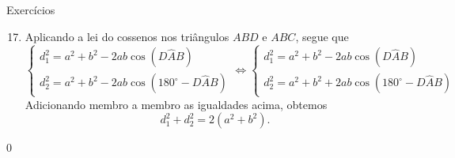 \begin{answer}{Exercícios}
{\exerciselist
\begin{enumerate}\setcounter{enumi}{16}
\item Aplicando a lei do cossenos nos triângulos $ABD$ e $ABC$, segue que
    $$\begin{cases}
    d_1^2=a^2+b^2-2ab\cos(D\hat{A}B)\\
    d_2^2=a^2+b^2-2ab\cos(180^\circ-D\hat{A}B)
    \end{cases} \iff
    \begin{cases}
    d_1^2=a^2+b^2-2ab\cos(D\hat{A}B)\\
    d_2^2=a^2+b^2+2ab\cos(180^\circ-D\hat{A}B)
    \end{cases} 
    $$
    Adicionando membro a membro as igualdades acima, obtemos 
    $$d_1^2+d_2^2=2(a^2+b^2).$$
\end{enumerate}
}{0}
\end{answer}
\clearmargin
